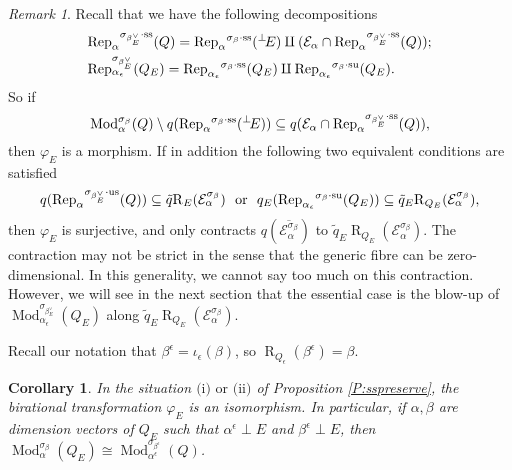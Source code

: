 \documentclass{amsart}
\newtheorem{corollary}[theorem]{Corollary}
\theoremstyle{definition}
\theoremstyle{remark}
\newtheorem{remark}[theorem]{Remark}
\numberwithin{equation}{section}
\begin{document}
\begin{remark} Recall that we have the following decompositions \begin{align*}
&{\operatorname{Rep}}_\alpha{^{\sigma_{{\beta_E^\vee}}\cdot{\rm {ss}}}}(Q)={\operatorname{Rep}}_\alpha{^{\sigma_{{\beta}}\cdot{\rm {ss}}}}({{^\perp}\!} E)\amalg({\mathcal{{E}}}_\alpha\cap{\operatorname{Rep}}_\alpha{^{\sigma_{{\beta_E^\vee}}\cdot{\rm {ss}}}}(Q));\\
&{\operatorname{Rep}}_{\alpha_\epsilon}^{\sigma_{\beta_E^\vee}}(Q_E)={\operatorname{Rep}}_{\alpha_\epsilon}{^{\sigma_{{\beta}}\cdot{\rm {ss}}}}(Q_E)\amalg {\operatorname{Rep}}_{\alpha_\epsilon}{^{\sigma_{{\beta}}\cdot{\rm {su}}}}(Q_E).\end{align*}
So if
\begin{equation} \label{eq:morphism} 
{\operatorname{Mod}}_\alpha^{\sigma_\beta}(Q)\setminus q({\operatorname{Rep}}_\alpha{^{\sigma_{{\beta}}\cdot{\rm {ss}}}}({{^\perp}\!} E))\subseteq q({\mathcal{{E}}}_\alpha\cap{\operatorname{Rep}}_\alpha{^{\sigma_{{\beta_E^\vee}}\cdot{\rm {ss}}}}(Q)),
\end{equation}
then $\varphi_E$ is a morphism.
If in addition the following two equivalent conditions are satisfied
\begin{equation} \label{eq:contraction} q({\operatorname{Rep}}_\alpha{^{\sigma_{{\beta_E^\vee}}\cdot{\rm {us}}}}(Q))\subseteq \tilde{q}{\operatorname{R}}_E({\mathcal{{E}}}_\alpha^{\sigma_\beta})\ \text{ or }\ q_E({\operatorname{Rep}}_{\alpha_\epsilon}{^{\sigma_{{\beta}}\cdot{\rm {su}}}}(Q_E))\subseteq \tilde{q}_E{\operatorname{R}}_{Q_E}({\mathcal{{E}}}_\alpha^{\sigma_\beta}), \end{equation}
then $\varphi_E$ is surjective, and only contracts $q(\overline{{\mathcal{{E}}}_\alpha^{\sigma_\beta}})$ to $\tilde{q}_E{\operatorname{R}}_{Q_E}({\mathcal{{E}}}_\alpha^{\sigma_\beta})$.
The contraction may not be strict in the sense that the generic fibre can be zero-dimensional. In this generality, we cannot say too much on this contraction. However, we will see in the next section that the essential case is the blow-up of ${\operatorname{Mod}}_{\alpha_\epsilon}^{\sigma_{\beta_E^\vee}}(Q_E)$ along $\tilde{q}_E{\operatorname{R}}_{Q_E}({\mathcal{{E}}}_\alpha^{\sigma_\beta})$.
\end{remark}

Recall our notation that $\beta^\epsilon=\iota_\epsilon(\beta)$, so ${\operatorname{R}}_{Q_\epsilon}(\beta^\epsilon)=\beta$.
\begin{corollary} \label{C:iso} In the situation $\text{(i) or (ii)}$ of Proposition \ref{P:sspreserve}, the birational transformation $\varphi_E$ is an isomorphism.
In particular, if $\alpha,\beta$ are dimension vectors of $Q_E$ such that $\alpha^\epsilon\perp E$ and $\beta^\epsilon\perp E$, then ${\operatorname{Mod}}_\alpha^{\sigma_\beta}(Q_E)\cong{\operatorname{Mod}}_{\alpha^\epsilon}^{\sigma_{\beta^\epsilon}}(Q)$.
\end{corollary}
\end{document}
